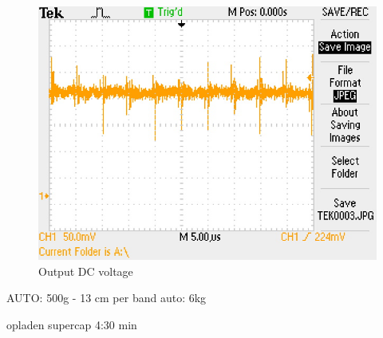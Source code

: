 \documentclass[final]{scrreprt} %
\begin{document}
\begin{figure}[h]
	\begin{center}
		\includegraphics[width=\linewidth/2]{resources/DC_out-rc.jpg}
	\end{center}
	\caption{Output DC voltage}
	\label{fig:DC_out}
\end{figure}

AUTO:
500g - 13 cm per band
auto: 6kg

opladen supercap 4:30 min
\end{document}
